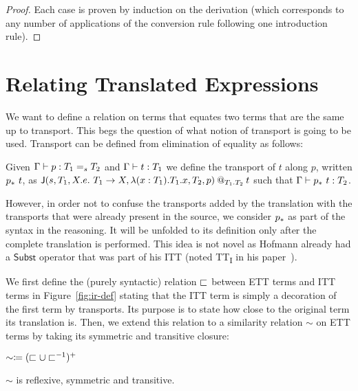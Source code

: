 \begin{proof}
  Each case is proven by induction on the derivation
  (which corresponds to any number of applications of the conversion rule
  following one introduction rule).
\end{proof}

\section{Relating Translated Expressions}
\label{sec:relation}

We want to define a relation on terms that equates two terms that are
the same up to transport.
%
This begs the question of what notion of transport is going to be
used.
%
Transport can be defined from elimination of equality as follows:
%
\begin{definition}[Transport]
  Given $\isterm{\Ga}{p}{\Eq{s}{T_1}{T_2}}$ and
  $\isterm{\Ga}{t}{T_1}$ we define the transport of $t$ along $p$, written
  $\transpo{p}\ t$, as
  $\app
    {\J
      {s}
      {T_1}
      {X.e.\ T_1 \to X}
      {\lam{x:T_1}{T_1} x}
      {T_2}
      {p}
    }
    {T_1}
    {T_2}
    {t}
  $ such that $\isterm{\Ga}{\transpo{p}\ t}{T_2}$.
\end{definition}
%
However, in order not to confuse the transports added by the
translation with the transports that were already present in the
source, we consider $\transpo{p}$ as part of the syntax in the
reasoning. It will be unfolded to its definition only after the
complete translation is performed.
%
This idea is not novel as Hofmann already had a $\mathsf{Subst}$ operator that
was part of his ITT (noted TT\textsubscript{I} in his
paper~\cite{hofmann1995conservativity}).

%
We first define the (purely syntactic) relation $\ir$ between ETT terms
and ITT terms in Figure~\ref{fig:ir-def} stating that the ITT term is
simply a decoration of the first term by transports. Its purpose is to
state how close to the original term its translation is. Then, we extend
this relation to a similarity relation $\sim$ on ETT terms by taking its
symmetric and transitive closure:
\begin{center}$\sim \coloneqq (\ir \cup \ir^{-1})^+$
\end{center}

\begin{lemma}
  \label{lem:sim-er}
  $\sim$ is reflexive, symmetric and transitive.
\end{lemma}

